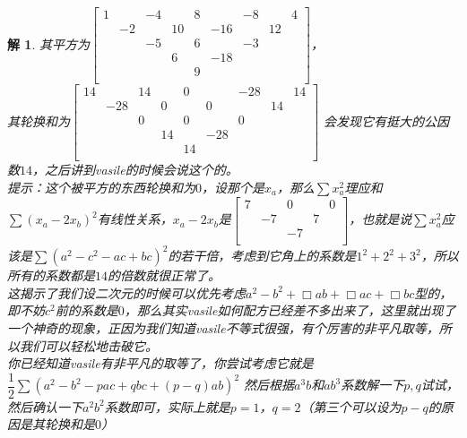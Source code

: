 \documentclass[UTF8]{ctexart}
\newtheorem{2}{解}
\begin{document}
\begin{2}
	其平方为$ \left[\begin{matrix}
		1& &-4& &8& &-8& &4\\
		&-2& &10& &-16& &12&\\
		& &-5& &6& &-3& &\\
		& & &6& &-18& & &\\
		& & & &9& & & &\\
	\end{matrix}\right] $，\\
   其轮换和为$ \left[\begin{matrix}
   	14& &14& &0& &-28& &14\\
   	&-28& &0& &0& &14&\\
   	& &0& &0& &0& &\\
   	& & &14& &-28& & &\\
   	& & & &14& & & &\\
   \end{matrix}\right] $
会发现它有挺大的公因数$ 14 $，之后讲到vasile的时候会说这个的。\\
提示：这个被平方的东西轮换和为$ 0 $，设那个是$ x_a $，那么$ \displaystyle \sum x_a^{2} $理应和$ \displaystyle \sum(x_a-2x_b)^{2} $有线性关系，$ x_a-2x_b $是$ \left[\begin{matrix}
	7& &0& &0\\
	&-7& &7&\\
	& &-7& &\\
\end{matrix}\right] $，也就是说$ \displaystyle \sum x_a^{2} $应该是$ \displaystyle \sum (a^{2}-c^{2}-ac+bc)^{2} $的若干倍，考虑到它角上的系数是$ 1^{2}+2^{2}+3^{2} $，所以所有的系数都是$ 14 $的倍数就很正常了。\\
这揭示了我们设二次元的时候可以优先考虑$ a^{2}-b^{2}+\Box ab+\Box ac+\Box bc $型的，即不妨$ c^{2} $前的系数是$ 0 $，那么其实vasile如何配方已经差不多出来了，这里就出现了一个神奇的现象，正因为我们知道vasile不等式很强，有个厉害的非平凡取等，所以我们可以轻松地击破它。\\
你已经知道vasile有非平凡的取等了，你尝试考虑它就是$ \dfrac{1}{2} \displaystyle \sum (a^{2}-b^{2}-pac+qbc+(p-q)ab)^{2} $
然后根据$ a^{3}b $和$ ab^{3} $系数解一下$ p,q $试试，然后确认一下$ a^{2}b^{2} $系数即可，实际上就是$ p=1 $，$ q=2 $（第三个可以设为$ p-q $的原因是其轮换和是$ 0 $）
\end{2}
\end{document}
